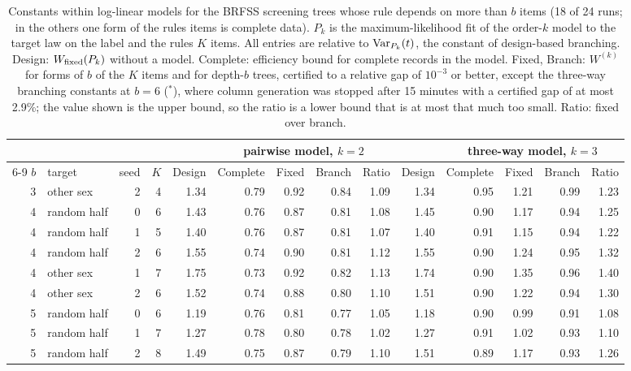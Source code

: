 \begin{table}[h]
\centering
\caption{Constants within log-linear models for the BRFSS screening trees whose rule depends on more than $b$ items (18 of 24 runs; in the others one form of the rule\textquotesingle s items is complete data). $P_k$ is the maximum-likelihood fit of the order-$k$ model to the target law on the label and the rule\textquotesingle s $K$ items. All entries are relative to $\operatorname{Var}_{P_k}(t)$, the constant of design-based branching. Design: $W_{\rm fixed}(P_k)$ without a model. Complete: efficiency bound for complete records in the model. Fixed, Branch: $W^{(k)}$ for forms of $b$ of the $K$ items and for depth-$b$ trees, certified to a relative gap of $10^{-3}$ or better, except the three-way branching constants at $b=6$ ($^\ast$), where column generation was stopped after 15 minutes with a certified gap of at most 2.9\%; the value shown is the upper bound, so the ratio is a lower bound that is at most that much too small. Ratio: fixed over branch.}
\label{tab:model}
\scriptsize
\setlength{\tabcolsep}{3.2pt}
\begin{tabular}{rlrr r rrrr r rrrr}
\toprule
 & & & & & \multicolumn{4}{c}{pairwise model, $k=2$} & & \multicolumn{4}{c}{three-way model, $k=3$} \\
\cmidrule{6-9}\cmidrule{11-14}
$b$ & target & seed & $K$ & Design & Complete & Fixed & Branch & Ratio & Design & Complete & Fixed & Branch & Ratio \\
\midrule
3 & other sex & 2 & 4 & 1.34 & 0.79 & 0.92 & 0.84 & 1.09 & 1.34 & 0.95 & 1.21 & 0.99 & 1.23 \\
4 & random half & 0 & 6 & 1.43 & 0.76 & 0.87 & 0.81 & 1.08 & 1.45 & 0.90 & 1.17 & 0.94 & 1.25 \\
4 & random half & 1 & 5 & 1.40 & 0.76 & 0.87 & 0.81 & 1.07 & 1.40 & 0.91 & 1.15 & 0.94 & 1.22 \\
4 & random half & 2 & 6 & 1.55 & 0.74 & 0.90 & 0.81 & 1.12 & 1.55 & 0.90 & 1.24 & 0.95 & 1.32 \\
4 & other sex & 1 & 7 & 1.75 & 0.73 & 0.92 & 0.82 & 1.13 & 1.74 & 0.90 & 1.35 & 0.96 & 1.40 \\
4 & other sex & 2 & 6 & 1.52 & 0.74 & 0.88 & 0.80 & 1.10 & 1.51 & 0.90 & 1.22 & 0.94 & 1.30 \\
5 & random half & 0 & 6 & 1.19 & 0.76 & 0.81 & 0.77 & 1.05 & 1.18 & 0.90 & 0.99 & 0.91 & 1.08 \\
5 & random half & 1 & 7 & 1.27 & 0.78 & 0.80 & 0.78 & 1.02 & 1.27 & 0.91 & 1.02 & 0.93 & 1.10 \\
5 & random half & 2 & 8 & 1.49 & 0.75 & 0.87 & 0.79 & 1.10 & 1.51 & 0.89 & 1.17 & 0.93 & 1.26 \\

\end{tabular}
\end{table}
